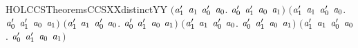 \begin{SaveVerbatim}{HOLCCSTheoremsCCSXXdistinctYY}
   \ensuremath{(}\HOLSymConst{\HOLTokenForall{}}\ensuremath{\HOLBoundVar{a}\sb{\mathrm{1}}\sp{\prime}} \ensuremath{\HOLBoundVar{a}\sb{\mathrm{1}}} \ensuremath{\HOLBoundVar{a}\sb{\mathrm{0}}\sp{\prime}} \ensuremath{\HOLBoundVar{a}\sb{\mathrm{0}}}.  \ensuremath{\HOLBoundVar{a}\sb{\mathrm{0}}\sp{\prime}} \ensuremath{\HOLBoundVar{a}\sb{\mathrm{1}}\sp{\prime}} \HOLSymConst{\HOLTokenNotEqual{}} \ensuremath{\HOLBoundVar{a}\sb{\mathrm{0}}} \HOLSymConst{\ensuremath{\mid}} \ensuremath{\HOLBoundVar{a}\sb{\mathrm{1}}}\ensuremath{)} \HOLSymConst{\HOLTokenConj{}}
   \ensuremath{(}\HOLSymConst{\HOLTokenForall{}}\ensuremath{\HOLBoundVar{a}\sb{\mathrm{1}}\sp{\prime}} \ensuremath{\HOLBoundVar{a}\sb{\mathrm{1}}} \ensuremath{\HOLBoundVar{a}\sb{\mathrm{0}}\sp{\prime}} \ensuremath{\HOLBoundVar{a}\sb{\mathrm{0}}}.  \ensuremath{\HOLBoundVar{a}\sb{\mathrm{0}}\sp{\prime}} \ensuremath{\HOLBoundVar{a}\sb{\mathrm{1}}\sp{\prime}} \HOLSymConst{\HOLTokenNotEqual{}} \ensuremath{\HOLBoundVar{a}\sb{\mathrm{0}}} \HOLSymConst{\ensuremath{\mid}} \ensuremath{\HOLBoundVar{a}\sb{\mathrm{1}}}\ensuremath{)} \HOLSymConst{\HOLTokenConj{}}
   \ensuremath{(}\HOLSymConst{\HOLTokenForall{}}\ensuremath{\HOLBoundVar{a}\sb{\mathrm{1}}\sp{\prime}} \ensuremath{\HOLBoundVar{a}\sb{\mathrm{1}}} \ensuremath{\HOLBoundVar{a}\sb{\mathrm{0}}\sp{\prime}} \ensuremath{\HOLBoundVar{a}\sb{\mathrm{0}}}.  \ensuremath{\HOLBoundVar{a}\sb{\mathrm{0}}\sp{\prime}} \ensuremath{\HOLBoundVar{a}\sb{\mathrm{1}}\sp{\prime}} \HOLSymConst{\HOLTokenNotEqual{}} \ensuremath{\HOLBoundVar{a}\sb{\mathrm{0}}} \HOLSymConst{\ensuremath{\mid}} \ensuremath{\HOLBoundVar{a}\sb{\mathrm{1}}}\ensuremath{)} \HOLSymConst{\HOLTokenConj{}}
   \ensuremath{(}\HOLSymConst{\HOLTokenForall{}}\ensuremath{\HOLBoundVar{a}\sb{\mathrm{1}}\sp{\prime}} \ensuremath{\HOLBoundVar{a}\sb{\mathrm{1}}} \ensuremath{\HOLBoundVar{a}\sb{\mathrm{0}}\sp{\prime}} \ensuremath{\HOLBoundVar{a}\sb{\mathrm{0}}}.  \ensuremath{\HOLBoundVar{a}\sb{\mathrm{0}}\sp{\prime}} \ensuremath{\HOLBoundVar{a}\sb{\mathrm{1}}\sp{\prime}} \HOLSymConst{\HOLTokenNotEqual{}}  \ensuremath{\HOLBoundVar{a}\sb{\mathrm{0}}} \ensuremath{\HOLBoundVar{a}\sb{\mathrm{1}}}\ensuremath{)} \HOLSymConst{\HOLTokenConj{}}
   \ensuremath{(}\HOLSymConst{\HOLTokenForall{}}\ensuremath{\HOLBoundVar{a}\sb{\mathrm{1}}\sp{\prime}} \ensuremath{\HOLBoundVar{a}\sb{\mathrm{1}}} \ensuremath{\HOLBoundVar{a}\sb{\mathrm{0}}\sp{\prime}} \ensuremath{\HOLBoundVar{a}\sb{\mathrm{0}}}.  \ensuremath{\HOLBoundVar{a}\sb{\mathrm{0}}\sp{\prime}} \ensuremath{\HOLBoundVar{a}\sb{\mathrm{1}}\sp{\prime}} \HOLSymConst{\HOLTokenNotEqual{}}  \ensuremath{\HOLBoundVar{a}\sb{\mathrm{0}}} \ensuremath{\HOLBoundVar{a}\sb{\mathrm{1}}}\ensuremath{)} \HOLSymConst{\HOLTokenConj{}}

\end{SaveVerbatim}
